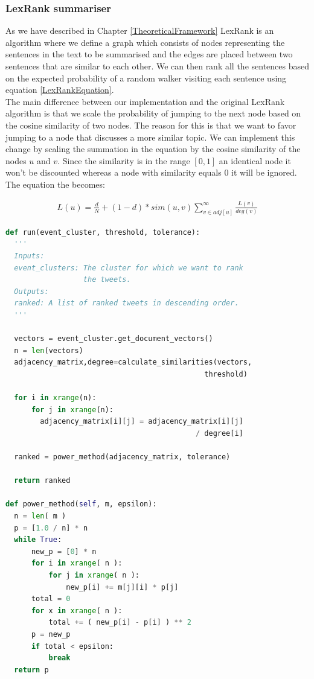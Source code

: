 \subsubsection{LexRank summariser}
As we have described in Chapter \ref{TheoreticalFramework} 
LexRank is an algorithm where we define a graph which consists of nodes representing the sentences in the text to be summarised and the 
edges are placed between two sentences that are similar to each other. We can then rank all the sentences 
based on the expected probability of a random walker visiting each sentence using equation \ref{LexRankEquation}. \\
The main difference between our implementation and the original LexRank algorithm is that we scale the probability of 
jumping to the next node based on the cosine similarity of two nodes. The reason for this is that we want to favor jumping to 
a node that discusses a more similar topic. We can implement this change by scaling the summation in the equation by the cosine similarity 
of the nodes $u$ and $v$. Since the similarity is in the range $[0, 1]$ an identical node it won't be discounted whereas a node with similarity equals 0 
it will be ignored. The equation the becomes:

\begin{eqnarray}\label{LexRankEquationModified}
L(u) = \frac{d}{N} + (1-d) * sim(u, v) \sum_{v \in adj[u]}^{\infty}\frac{L(v)}{deg(v)}
\end{eqnarray} 

\begin{lstlisting}[language=Python, label=CentroidSummariserSnippet, caption=Pseudocode for the centoid-based summariser.]
def run(event_cluster, threshold, tolerance):
  '''
  Inputs:
  event_clusters: The cluster for which we want to rank 
                  the tweets.
  Outputs:
  ranked: A list of ranked tweets in descending order. 
  '''        

  vectors = event_cluster.get_document_vectors()      
  n = len(vectors)
  adjacency_matrix,degree=calculate_similarities(vectors, 
                                              threshold)
  
  for i in xrange(n):
      for j in xrange(n):
        adjacency_matrix[i][j] = adjacency_matrix[i][j] 
                                            / degree[i]
                                            
  ranked = power_method(adjacency_matrix, tolerance)        
  
  return ranked
    
def power_method(self, m, epsilon):
  n = len( m )
  p = [1.0 / n] * n
  while True:
      new_p = [0] * n
      for i in xrange( n ):
          for j in xrange( n ):
              new_p[i] += m[j][i] * p[j]
      total = 0
      for x in xrange( n ):
          total += ( new_p[i] - p[i] ) ** 2
      p = new_p
      if total < epsilon:
          break
  return p  
\end{lstlisting}

